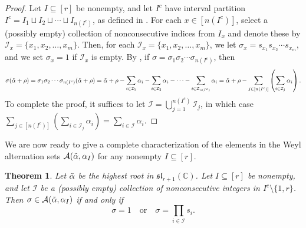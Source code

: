\documentclass[10pt]{article}
\newtheorem{theorem}{Theorem}[section]
\newcommand{\speclin}[0]{\mathfrak{sl}_{r+1}(\mathbb{C})}
\newcommand{\hr}[0]{\Tilde{\alpha}}
\newcommand{\newmu}[0]{\alpha_I}
\newcommand{\thealtset}[0]{\mathcal{A}(\hr,\newmu)}
\begin{document}
\begin{proof}
    Let $I\subseteq[r]$ be nonempty, and let $I^c$ have interval partition $I^c=I_1\sqcup I_2\sqcup \cdots \sqcup I_{n(I^c)}$, as defined in .
    For each $x\in [n(I^c)]$, select a (possibly empty) collection of nonconsecutive indices from $I_x$ and denote these by $\mathcal{I}_x=\{x_1,x_2,\ldots,x_m\}$. 
    Then, for each $\mathcal{I}_x=\{x_1,x_2,\ldots,x_m\}$, we let $\sigma_x=s_{x_1}s_{x_2}\cdots s_{x_m}$, and we set $\sigma_x=1$ if $\mathcal{I}_x$ is empty.
    By , if $\sigma=\sigma_1\sigma_2\cdots \sigma_{n(I^c)}$, then
    \begin{equation}
    \sigma(\hr+\rho)=\sigma_1\sigma_2\cdots \sigma_{n(I^c)}(\hr+\rho)=\hr+\rho - \sum_{i\in\mathcal{I}_1}\alpha_{i}- \sum_{i\in\mathcal{I}_2}\alpha_{i}-\cdots - \sum_{i\in\mathcal{I}_{n(I^c)}}\alpha_{i}=\hr+\rho-\sum_{j\in[n(I^c)]}\left(\sum_{i\in\mathcal{I}_j}\alpha_{i}\right).\notag
    \end{equation}
    To complete the proof, it suffices to let $\mathcal{I}=\displaystyle\bigcup_{j=1}^{n(I^c)}\mathcal{I}_j$, in which case $\displaystyle\sum_{j\in[n(I^c)]}\left(\displaystyle\sum_{i\in\mathcal{I}_j}\alpha_{i}\right)=\sum_{i\in\mathcal{I}}\alpha_i$.
\end{proof}
We are now ready to give a complete characterization of the elements in the Weyl alternation sets $\thealtset$ for any nonempty $I\subseteq [r]$. 
\begin{theorem}\label{thm:whats in the alt set} 
Let $\hr$ be the highest root in $\speclin$.
    Let $I\subseteq[r]$ be nonempty, and let $\mathcal{I}$ be a (possibly empty) collection of nonconsecutive integers in $I^c\setminus\{1,r\}$.     
    Then $\sigma\in\thealtset$ if and only if 
    \[\sigma=1 \quad \text{or} \quad \sigma=\prod_{i\in \mathcal{I}}s_i.\]
\end{theorem}
\end{document}
